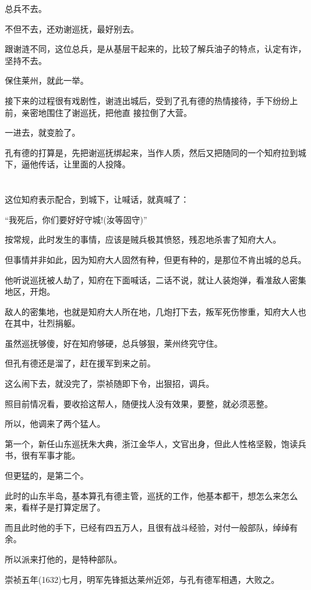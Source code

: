\documentclass[11pt,a4paper,onecolumn]{article}
\begin{document}
总兵不去。

不但不去，还劝谢巡抚，最好别去。

跟谢涟不同，这位总兵，是从基层干起来的，比较了解兵油子的特点，认定有诈，坚持不去。

保住莱州，就此一举。

接下来的过程很有戏剧性，谢涟出城后，受到了孔有德的热情接待，手下纷纷上前，亲密地围住了谢巡抚，把他直
接拉倒了大营。

一进去，就变脸了。

孔有德的打算是，先把谢巡抚绑起来，当作人质，然后又把随同的一个知府拉到城下，逼他传话，让里面的人投降。

\section[\thesection]{}

这位知府表示配合，到城下，让喊话，就真喊了：

``我死后，你们要好好守城!(汝等固守)''

按常规，此时发生的事情，应该是贼兵极其愤怒，残忍地杀害了知府大人。

但事情并非如此，因为知府大人固然有种，但更有种的，是那位不肯出城的总兵。

他听说巡抚被人劫了，知府在下面喊话，二话不说，就让人装炮弹，看准敌人密集地区，开炮。

敌人的密集地，也就是知府大人所在地，几炮打下去，叛军死伤惨重，知府大人也在其中，壮烈捐躯。

虽然巡抚够傻，好在知府够硬，总兵够狠，莱州终究守住。

但孔有德还是溜了，赶在援军到来之前。

这么闹下去，就没完了，崇祯随即下令，出狠招，调兵。

照目前情况看，要收拾这帮人，随便找人没有效果，要整，就必须恶整。

所以，他调来了两个猛人。

第一个，新任山东巡抚朱大典，浙江金华人，文官出身，但此人性格坚毅，饱读兵书，很有军事才能。

但更猛的，是第二个。

此时的山东半岛，基本算孔有德主管，巡抚的工作，他基本都干，想怎么来怎么来，看样子是打算定居了。

而且此时他的手下，已经有四五万人，且很有战斗经验，对付一般部队，绰绰有余。

所以派来打他的，是特种部队。

崇祯五年(1632)七月，明军先锋抵达莱州近郊，与孔有德军相遇，大败之。
\end{document}
